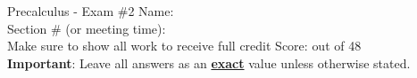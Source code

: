 \documentclass[addpoints]{exam}
\begin{document}
\begin{flushleft}
Precalculus -  Exam \#2 \hfill  Name: \underline{\hspace{2.5 in}} \\  
  \hfill  Section \# (or meeting time):  \underline{\hspace{1in}}\\  %
Make sure to show all work to receive full credit  \hfill  Score: \underline{\hspace{0.5in}} out of 48 \\
{\bf Important}: Leave all answers as an \underline{\bf exact} value unless otherwise stated.
\end{flushleft}
\end{document}
